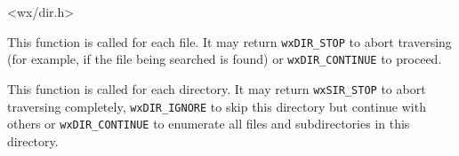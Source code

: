 
<wx/dir.h>


\label{wxdirtraverseronfile}


This function is called for each file. It may return {\tt wxDIR\_STOP} to abort
traversing (for example, if the file being searched is found) or 
{\tt wxDIR\_CONTINUE} to proceed.

\label{wxdirtraverserondir}


This function is called for each directory. It may return {\tt wxSIR\_STOP} 
to abort traversing completely, {\tt wxDIR\_IGNORE} to skip this directory but
continue with others or {\tt wxDIR\_CONTINUE} to enumerate all files and
subdirectories in this directory.


